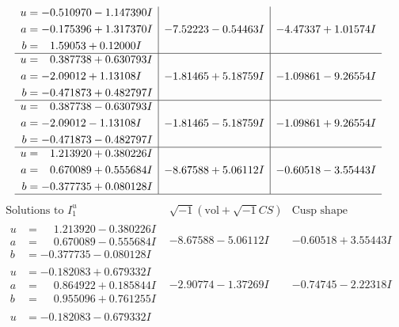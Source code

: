 \documentclass[1p]{elsarticle_modified}
\theoremstyle{definition}
\newcommand{\I}{\sqrt{-1}}
\begin{document}
$$\begin{array}{c|c|c}
\begin{aligned}
u &= -0.510970 - 1.147390 I \\
a &= -0.175396 + 1.317370 I \\
b &= \phantom{-}1.59053 + 0.12000 I\end{aligned}
 & -7.52223 - 0.54463 I & -4.47337 + 1.01574 I \\ \hline\begin{aligned}
u &= \phantom{-}0.387738 + 0.630793 I \\
a &= -2.09012 + 1.13108 I \\
b &= -0.471873 + 0.482797 I\end{aligned}
 & -1.81465 + 5.18759 I & -1.09861 - 9.26554 I \\ \hline\begin{aligned}
u &= \phantom{-}0.387738 - 0.630793 I \\
a &= -2.09012 - 1.13108 I \\
b &= -0.471873 - 0.482797 I\end{aligned}
 & -1.81465 - 5.18759 I & -1.09861 + 9.26554 I \\ \hline\begin{aligned}
u &= \phantom{-}1.213920 + 0.380226 I \\
a &= \phantom{-}0.670089 + 0.555684 I \\
b &= -0.377735 + 0.080128 I\end{aligned}
 & -8.67588 + 5.06112 I & -0.60518 - 3.55443 I\\
 \hline 
 \end{array}$$\newpage$$\begin{array}{c|c|c}  
\text{Solutions to }I^u_{1}& \I (\text{vol} + \sqrt{-1}CS) & \text{Cusp shape}\\
 \hline 
\begin{aligned}
u &= \phantom{-}1.213920 - 0.380226 I \\
a &= \phantom{-}0.670089 - 0.555684 I \\
b &= -0.377735 - 0.080128 I\end{aligned}
 & -8.67588 - 5.06112 I & -0.60518 + 3.55443 I \\ \hline\begin{aligned}
u &= -0.182083 + 0.679332 I \\
a &= \phantom{-}0.864922 + 0.185844 I \\
b &= \phantom{-}0.955096 + 0.761255 I\end{aligned}
 & -2.90774 - 1.37269 I & -0.74745 - 2.22318 I \\ \hline\begin{aligned}
u &= -0.182083 - 0.679332 I \\

\end{aligned}
\end{array}$$
\end{document}
